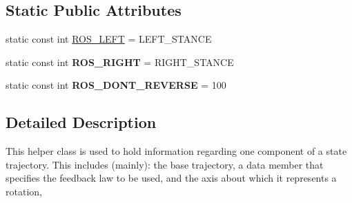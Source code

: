 \subsection*{Static Public Attributes}
\begin{DoxyCompactItemize}
\item 
static const int \hyperlink{classCartWheel_1_1Core_1_1TrajectoryComponent_ac899396bf7d17c2e1c1d4353f6e33376}{ROS\_\-LEFT} = LEFT\_\-STANCE
\item 
\hypertarget{classCartWheel_1_1Core_1_1TrajectoryComponent_af4f8919caab1be89c9a244a20511fdbe}{
static const int {\bfseries ROS\_\-RIGHT} = RIGHT\_\-STANCE}
\label{classCartWheel_1_1Core_1_1TrajectoryComponent_af4f8919caab1be89c9a244a20511fdbe}

\item 
\hypertarget{classCartWheel_1_1Core_1_1TrajectoryComponent_ab75d8e9043cc0eeb8e0119d2cfbf8925}{
static const int {\bfseries ROS\_\-DONT\_\-REVERSE} = 100}
\label{classCartWheel_1_1Core_1_1TrajectoryComponent_ab75d8e9043cc0eeb8e0119d2cfbf8925}

\end{DoxyCompactItemize}


\subsection{Detailed Description}
This helper class is used to hold information regarding one component of a state trajectory. This includes (mainly): the base trajectory, a data member that specifies the feedback law to be used, and the axis about which it represents a rotation, 

